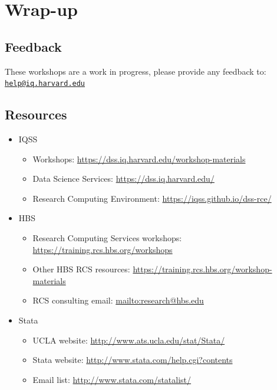 \documentclass[
]{book}
\providecommand{\tightlist}{%
  \setlength{\itemsep}{0pt}\setlength{\parskip}{0pt}}
\begin{document}
\hypertarget{wrap-up-9}{%
\section{Wrap-up}\label{wrap-up-9}}

\hypertarget{feedback-9}{%
\subsection{Feedback}\label{feedback-9}}

These workshops are a work in progress, please provide any feedback to: \href{mailto:help@iq.harvard.edu}{\nolinkurl{help@iq.harvard.edu}}

\hypertarget{resources-12}{%
\subsection{Resources}\label{resources-12}}

\begin{itemize}
\tightlist
\item
  IQSS

  \begin{itemize}
  \tightlist
  \item
    Workshops: \url{https://dss.iq.harvard.edu/workshop-materials}
  \item
    Data Science Services: \url{https://dss.iq.harvard.edu/}
  \item
    Research Computing Environment: \url{https://iqss.github.io/dss-rce/}
  \end{itemize}
\item
  HBS

  \begin{itemize}
  \tightlist
  \item
    Research Computing Services workshops: \url{https://training.rcs.hbs.org/workshops}
  \item
    Other HBS RCS resources: \url{https://training.rcs.hbs.org/workshop-materials}
  \item
    RCS consulting email: \url{mailto:research@hbs.edu}
  \end{itemize}
\item
  Stata

  \begin{itemize}
  \tightlist
  \item
    UCLA website: \url{http://www.ats.ucla.edu/stat/Stata/}
  \item
    Stata website: \url{http://www.stata.com/help.cgi?contents}
  \item
    Email list: \url{http://www.stata.com/statalist/}
  \end{itemize}
\end{itemize}
\end{document}
